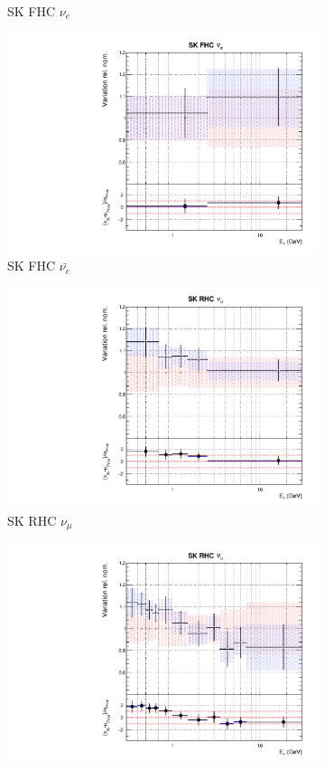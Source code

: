 \begin{figure}
\begin{subfigure}{0.45\textwidth}
  \caption{SK FHC $\nu_{e}$}
\end{subfigure}
\begin{subfigure}{0.45\textwidth}
  \centering
  \includegraphics[width=0.75\linewidth]{figs/jointflux11}
  \caption{SK FHC $\bar{\nu_{e}}$}
\end{subfigure}
\begin{subfigure}{0.45\textwidth}
  \centering
  \includegraphics[width=0.75\linewidth]{figs/jointflux12}
  \caption{SK RHC $\nu_{\mu}$}
\end{subfigure}
\begin{subfigure}{0.45\textwidth}
  \centering
  \includegraphics[width=0.75\linewidth]{figs/jointflux13}

\end{subfigure}
\end{figure}
